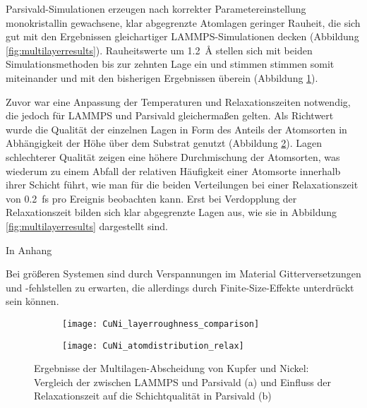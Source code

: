 Parsivald-Simulationen erzeugen nach korrekter Parametereinstellung monokristallin gewachsene, klar abgegrenzte Atomlagen geringer Rauheit, die sich gut mit den Ergebnissen gleichartiger LAMMPS-Simulationen decken (Abbildung \ref{fig:multilayerresults}).
Rauheitswerte um \SI{1.2}{\angstrom} stellen sich mit beiden Simulationsmethoden bis zur zehnten Lage ein und stimmen stimmen somit miteinander und mit den bisherigen Ergebnissen überein (Abbildung \ref{fig:multilayerplots-a}).

Zuvor war eine Anpassung der Temperaturen und Relaxationszeiten notwendig, die jedoch für LAMMPS und Parsivald gleichermaßen gelten.
Als Richtwert wurde die Qualität der einzelnen Lagen in Form des Anteils der Atomsorten in Abhängigkeit der Höhe über dem Substrat genutzt (Abbildung \ref{fig:multilayerplots-b}).
Lagen schlechterer Qualität zeigen eine höhere Durchmischung der Atomsorten, was wiederum zu einem Abfall der relativen Häufigkeit einer Atomsorte innerhalb ihrer Schicht führt, wie man für die beiden Verteilungen bei einer Relaxationszeit von \SI{0.2}{\femto\second} pro Ereignis beobachten kann.
Erst bei Verdopplung der Relaxationszeit bilden sich klar abgegrenzte Lagen aus, wie sie in Abbildung \ref{fig:multilayerresults} dargestellt sind.

In Anhang


Bei größeren Systemen sind durch Verspannungen im Material Gitterversetzungen und -fehlstellen zu erwarten, die allerdings durch Finite-Size-Effekte unterdrückt sein können.

\begin{figure}
  \captionsetup[subfigure]{singlelinecheck=false}
  \def\subfigwidth{7cm}
  \begin{subfigure}[t]{\subfigwidth}
    \texttt{[image: CuNi\_layerroughness\_comparison]}
    \label{fig:multilayerplots-a}
  \end{subfigure}
  \hfill
  \begin{subfigure}[t]{\subfigwidth}
    \texttt{[image: CuNi\_atomdistribution\_relax]}
    \label{fig:multilayerplots-b}
  \end{subfigure}
  \caption[Ergebnisse der Multilagen-Abscheidung von Kupfer und Nickel]{
    Ergebnisse der Multilagen-Abscheidung von Kupfer und Nickel:
    Vergleich der zwischen LAMMPS und Parsivald (a) und Einfluss der Relaxationszeit auf die Schichtqualität in Parsivald (b)
  }
  \label{fig:multilayerplots}
\end{figure}


